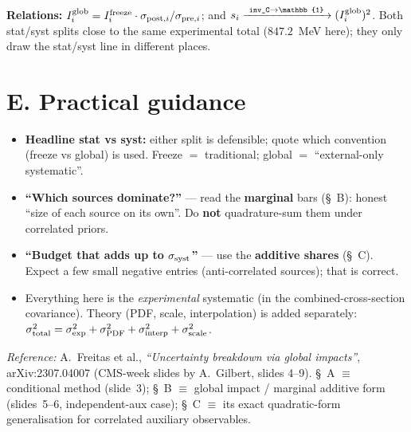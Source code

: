 \documentclass[11pt,a4paper]{article}
\newcommand{\code}[1]{\texttt{#1}}
\begin{document}
\bigskip
\textbf{Relations:}
$I^{\rm glob}_i = I^{\rm freeze}_i\cdot\sigma_{{\rm post},i}/\sigma_{{\rm pre},i}$;
and $s_i \xrightarrow{\ \code{inv\_C}\to\mathbb{1}\ } (I^{\rm glob}_i)^2$. Both
stat/syst splits close to the same experimental total ($847.2$~MeV here); they
only draw the stat/syst line in different places.

\section*{E. Practical guidance}

\begin{itemize}
  \item \textbf{Headline stat vs syst:} either split is defensible; quote which
    convention (freeze vs global) is used. Freeze $=$ traditional; global $=$
    ``external-only systematic''.
  \item \textbf{``Which sources dominate?''} --- read the \textbf{marginal} bars
    (\S~B): honest ``size of each source on its own''. Do \textbf{not}
    quadrature-sum them under correlated priors.
  \item \textbf{``Budget that adds up to $\sigma_{\rm syst}$''} --- use the
    \textbf{additive shares} (\S~C). Expect a few small negative entries
    (anti-correlated sources); that is correct.
  \item Everything here is the \emph{experimental} systematic (in the
    combined-cross-section covariance). Theory (PDF, scale, interpolation) is
    added separately:
    $\sigma_{\rm total}^2=\sigma_{\rm exp}^2+\sigma_{\rm PDF}^2+\sigma_{\rm interp}^2+\sigma_{\rm scale}^2$.
\end{itemize}

\bigskip
\noindent\textit{Reference:} A.~Freitas et al., \emph{``Uncertainty breakdown via
global impacts''}, arXiv:2307.04007 (CMS-week slides by A.~Gilbert, slides
4--9). \S~A $\equiv$ conditional method (slide~3); \S~B $\equiv$ global impact /
marginal additive form (slides~5--6, independent-aux case); \S~C $\equiv$ its
exact quadratic-form generalisation for correlated auxiliary observables.
\end{document}
